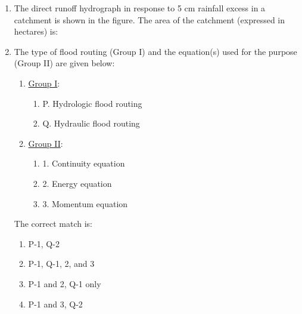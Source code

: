 \documentclass[journal]{IEEEtran}
\begin{document}
\begin{enumerate}
    \item The direct runoff hydrograph in response to 5 cm rainfall excess in a catchment is shown in the figure. The area of the catchment (expressed in hectares) is:\\
    
      \begin{figure}[H]
        \centering
    \end{figure}
       


        
    
    \item The type of flood routing (Group I) and the equation(s) used for the purpose (Group II) are given below:
    \begin{multicols}{2}
        \begin{enumerate}
            \item \underline{Group I}: 
                \begin{enumerate}
                    \item P. Hydrologic flood routing
                    \item Q. Hydraulic flood routing
                \end{enumerate}
            \item \underline{Group II}:
                \begin{enumerate}
                    \item 1. Continuity equation
                    \item 2. Energy equation
                    \item 3. Momentum equation
                \end{enumerate}
        \end{enumerate}
                \end{multicols}

    The correct match is:
    \begin{multicols}{2}
        \begin{enumerate}
            \item  P-1, Q-2
            \item  P-1, Q-1, 2, and 3
            \item  P-1 and 2, Q-1 only
            \item  P-1 and 3, Q-2
        \end{enumerate}
        \end{multicols}


\end{enumerate}
\end{document}
